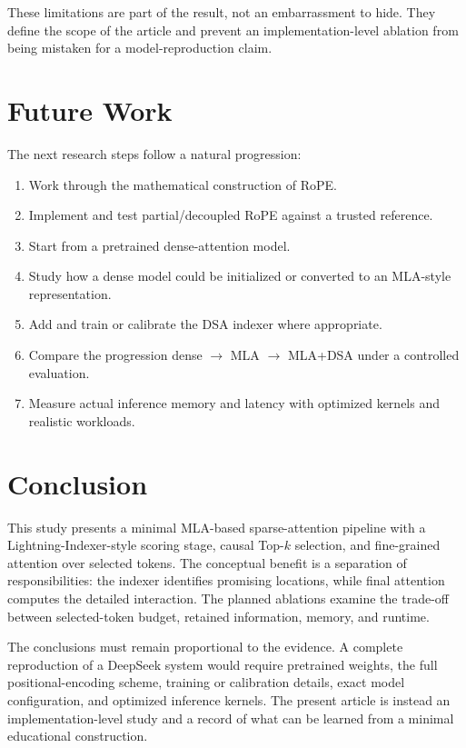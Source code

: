 \documentclass[11pt]{article}
\begin{document}
These limitations are part of the result, not an embarrassment to hide. They
define the scope of the article and prevent an implementation-level ablation
from being mistaken for a model-reproduction claim.

\section{Future Work}

The next research steps follow a natural progression:
\begin{enumerate}[leftmargin=*]
    \item Work through the mathematical construction of RoPE.
    \item Implement and test partial/decoupled RoPE against a trusted reference.
    \item Start from a pretrained dense-attention model.
    \item Study how a dense model could be initialized or converted to an
          MLA-style representation.
    \item Add and train or calibrate the DSA indexer where appropriate.
    \item Compare the progression dense $\rightarrow$ MLA $\rightarrow$
          MLA+DSA under a controlled evaluation.
    \item Measure actual inference memory and latency with optimized kernels
          and realistic workloads.
\end{enumerate}

\section{Conclusion}

This study presents a minimal MLA-based sparse-attention pipeline with a
Lightning-Indexer-style scoring stage, causal Top-$k$ selection, and
fine-grained attention over selected tokens. The conceptual benefit is a
separation of responsibilities: the indexer identifies promising locations,
while final attention computes the detailed interaction. The planned ablations
examine the trade-off between selected-token budget, retained information,
memory, and runtime.

The conclusions must remain proportional to the evidence. A complete
reproduction of a DeepSeek system would require pretrained weights, the full
positional-encoding scheme, training or calibration details, exact model
configuration, and optimized inference kernels. The present article is instead
an implementation-level study and a record of what can be learned from a
minimal educational construction.
\end{document}
